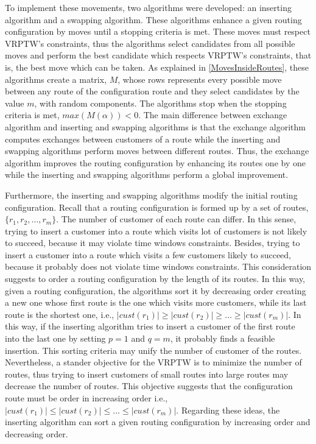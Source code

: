 To implement these movements, two algorithms were developed: an inserting algorithm and a swapping algorithm. These algorithms enhance a given routing configuration by moves until a stopping criteria is met. These moves must respect VRPTW's constraints, thus the algorithms select candidates from all possible moves and perform the best candidate which respects VRPTW's constraints, that is, the best move which can be taken. As explained in \ref{MovesInsideRoutes}, these algorithms create a matrix, $M$, whose rows represents every possible move between any route of the configuration route and they select candidates by the value $m$, with random components. The algorithms stop when the stopping criteria is met, $max(M(\alpha))<0$. The main difference between exchange algorithm and inserting and swapping algorithms is that the exchange algorithm computes exchanges between customers of a route while the inserting and swapping algorithms perform moves between different routes. Thus, the exchange algorithm improves the routing configuration by enhancing its routes one by one while the inserting and swapping algorithms perform a global improvement.

Furthermore, the inserting and swapping algorithms modify the initial routing configuration. Recall that a routing configuration is formed up by a set of routes, $\{r_{1},r_{2},\dots,r_{m}\}$. The number of customer of each route can differ. In this sense, trying to insert a customer into a route which visits lot of customers is not likely to succeed, because it may violate time windows constraints. Besides, trying to insert a customer into a route which visits a few customers likely to succeed, because it probably does not violate time windows constraints. This consideration suggests to order a routing configuration by the length of its routes. In this way, given a routing configuration, the algorithms sort it by decreasing order creating a new one whose first route is the one which visits more customers, while its last route is the shortest one, i.e., $|cust(r_1)| \geq |cust(r_2)| \geq  \dots \geq  |cust(r_m)|$. In this way, if the inserting algorithm tries to insert a customer of the first route into the last one by setting $p=1$ and $q=m$, it probably finds a feasible insertion. This sorting criteria may unify the number of customer of the routes. Nevertheless, a stander objective for the VRPTW is to minimize the number of routes, thus trying to insert customers of small routes into large routes may decrease the number of routes. This objective suggests that the configuration route must be order in increasing order i.e., $|cust(r_1)| \leq |cust(r_2)| \leq   \dots \leq |cust(r_m)|$. Regarding these ideas, the inserting algorithm can sort a given routing configuration by increasing order and decreasing order.

